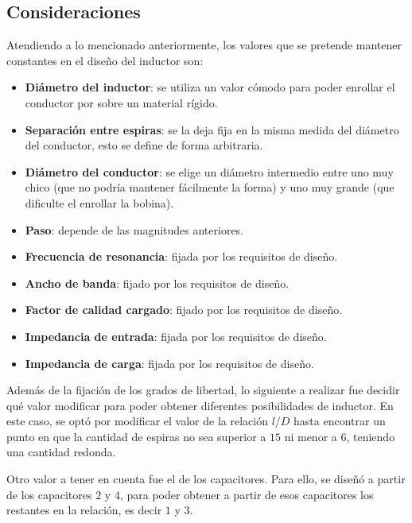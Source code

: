 \documentclass{article}
\begin{document}
\subsection{Consideraciones}
Atendiendo a lo mencionado anteriormente, los valores que se pretende mantener constantes en el diseño del inductor son:
\begin{itemize}
    \item \textbf{Diámetro del inductor}: se utiliza un valor cómodo para poder enrollar el conductor por sobre un material rígido.
    \item \textbf{Separación entre espiras}:  se la deja fija en la misma medida del diámetro del conductor, esto se define de forma arbitraria.
    \item \textbf{Diámetro del conductor}: se elige un diámetro intermedio entre uno muy chico (que no podría mantener fácilmente la forma) y uno muy grande (que dificulte el enrollar la bobina).
    \item \textbf{Paso}: depende de las magnitudes anteriores.
    \item \textbf{Frecuencia de resonancia}: fijada por los requisitos de diseño.
    \item \textbf{Ancho de banda}: fijado por los requisitos de diseño.
    \item \textbf{Factor de calidad cargado}: fijado por los requisitos de diseño.
    \item \textbf{Impedancia de entrada}:  fijada por los requisitos de diseño.
    \item \textbf{Impedancia de carga}: fijada por los requisitos de diseño.
\end{itemize}
\noindent Además de la fijación de los grados de libertad, lo siguiente a realizar fue decidir qué valor modificar para poder obtener diferentes posibilidades de inductor. En este caso, se optó por modificar el valor de la relación $l/D$ hasta encontrar un punto en que la cantidad de espiras no sea superior a $15$ ni menor a $6$, teniendo una cantidad redonda.

Otro valor a tener en cuenta fue el de los capacitores. Para ello, se diseñó a partir de los capacitores $2$ y $4$, para poder obtener a partir de esos capacitores los restantes en la relación, es decir $1$ y $3$. 
\end{document}
